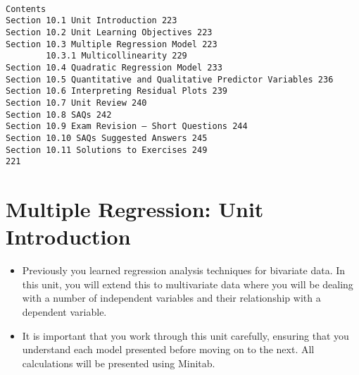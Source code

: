 \documentclass[]{report}
\begin{document}
\begin{verbatim}

Contents
Section 10.1 Unit Introduction 223
Section 10.2 Unit Learning Objectives 223
Section 10.3 Multiple Regression Model 223
        10.3.1 Multicollinearity 229
Section 10.4 Quadratic Regression Model 233
Section 10.5 Quantitative and Qualitative Predictor Variables 236
Section 10.6 Interpreting Residual Plots 239
Section 10.7 Unit Review 240
Section 10.8 SAQs 242
Section 10.9 Exam Revision – Short Questions 244
Section 10.10 SAQs Suggested Answers 245
Section 10.11 Solutions to Exercises 249
221
\end{verbatim}
\newpage
\section*{Multiple Regression: Unit Introduction}
\begin{itemize}
	\item Previously you learned regression analysis techniques for bivariate data. In this unit, you
	will extend this to multivariate data where you will be dealing with a number of
	independent variables and their relationship with a dependent variable. 
	\item It is important
	that you work through this unit carefully, ensuring that you understand each model
	presented before moving on to the next. All calculations will be presented using Minitab.
\end{itemize}
\end{document}
